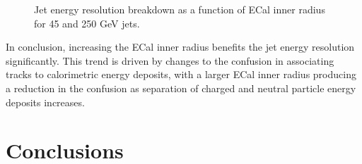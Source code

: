 \begin{figure}
\caption[Jet energy resolution breakdown as a function of ECal inner radius for 45 and 250 GeV jets.]{Jet energy resolution breakdown as a function of ECal inner radius for 45 and 250 GeV jets.}
\label{fig:ecalinnerrbreak}
\end{figure}

In conclusion, increasing the ECal inner radius benefits the jet energy resolution significantly.  This trend is driven by changes to the confusion in associating tracks to calorimetric energy deposits, with a larger ECal inner radius producing a reduction in the confusion as separation of charged and neutral particle energy deposits increases.  


\section{Conclusions}







